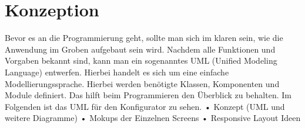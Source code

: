 \section{Konzeption}
\label{sec:konzept}
%
Bevor es an die Programmierung geht, sollte man sich im klaren sein, wie die Anwendung im Groben aufgebaut sein wird. Nachdem alle Funktionen und Vorgaben bekannt sind, kann man ein sogenanntes UML (Unified Modeling Language) entwerfen. Hierbei handelt es sich um eine einfache Modellierungssprache. Hierbei werden benötigte Klassen, Komponenten und Module definiert. Das hilft beim Programmieren den Überblick zu behalten. Im Folgenden  ist das UML für den Konfigurator zu sehen.
• Konzept (UML und weitere Diagramme)
• Mokups der Einzelnen Screens
• Responsive Layout Ideen \\
%